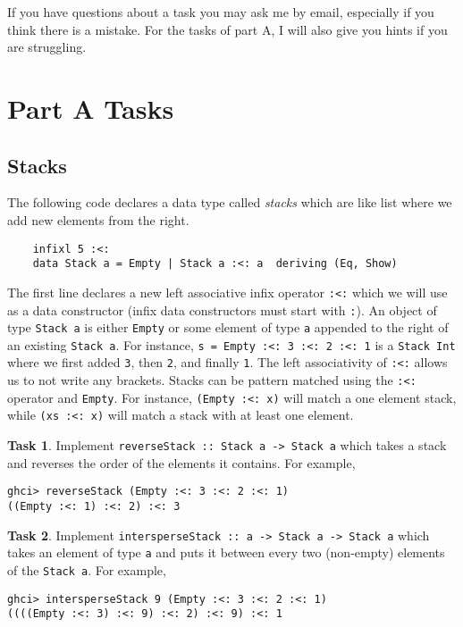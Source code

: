 \documentclass{article}[12pt]
\theoremstyle{definition}
\newtheorem{task}{Task}
\begin{document}
If you have questions about a task you may ask me by email, especially if you think there is a mistake. For the tasks of part A, I will also give you hints if you are struggling. 

\section{Part A Tasks}

\subsection{Stacks}
The following code declares a data type called \emph{stacks} which are like list where we add new elements from the right.
\begin{verbatim}
    infixl 5 :<:
    data Stack a = Empty | Stack a :<: a  deriving (Eq, Show)
\end{verbatim}
The first line declares a new left associative infix operator \verb|:<:| which we will use as a data constructor (infix data constructors must start with \verb|:|). An object of type \verb|Stack a| is either \verb|Empty| or some element of type \verb|a| appended to the right of an existing \verb|Stack a|. For instance, \verb|s = Empty :<: 3 :<: 2 :<: 1| is a \verb|Stack Int| where we first added \verb|3|, then \verb|2|, and finally \verb|1|. The left associativity of \verb|:<:| allows us to not write any brackets. Stacks can be pattern matched using the \verb|:<:| operator and \verb|Empty|. For instance, \verb|(Empty :<: x)| will match a one element stack, while \verb|(xs :<: x)| will match a stack with at least one element.

\begin{task}
    Implement \verb|reverseStack :: Stack a -> Stack a| which takes a stack and reverses the order of the elements it contains. For example, 
    \begin{verbatim}
ghci> reverseStack (Empty :<: 3 :<: 2 :<: 1)
((Empty :<: 1) :<: 2) :<: 3\end{verbatim}
\end{task}

\begin{task}
    Implement \verb|intersperseStack :: a -> Stack a -> Stack a| which takes an element of type \verb|a| and puts it between every two (non-empty) elements of the \verb|Stack a|. For example,
    \begin{verbatim}
ghci> intersperseStack 9 (Empty :<: 3 :<: 2 :<: 1)
((((Empty :<: 3) :<: 9) :<: 2) :<: 9) :<: 1\end{verbatim}
\end{task}
\end{document}
